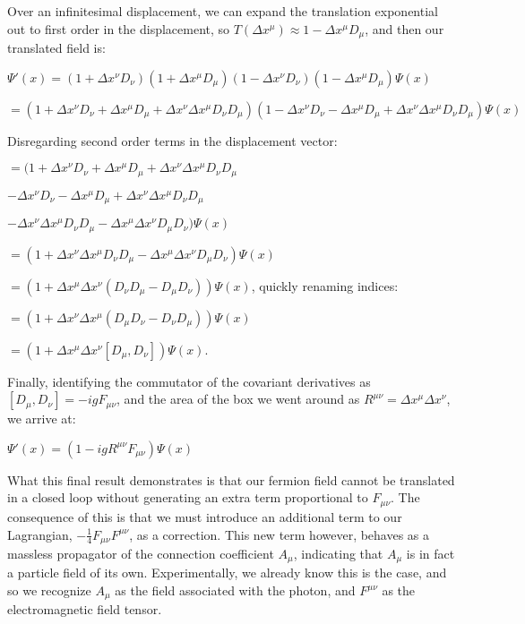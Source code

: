 \documentclass{article}
\begin{document}
        
        Over an infinitesimal displacement, we can expand the translation exponential out to first order in the displacement, so
        $ T(\Delta x^\mu) \approx 1 - \Delta x^\mu D_\mu $, and then our translated field is:


        $ \Psi'(x) = (1 + \Delta x^\nu D_\nu)(1 + \Delta x^\mu D_\mu)(1 - \Delta x^\nu D_\nu)(1 - \Delta x^\mu D_\mu) \Psi(x) $

        $ = (1 + \Delta x^\nu D_\nu + \Delta x^\mu D_\mu + \Delta x^\nu \Delta x^\mu D_\nu D_\mu)
        (1 - \Delta x^\nu D_\nu - \Delta x^\mu D_\mu + \Delta x^\nu \Delta x^\mu D_\nu D_\mu) \Psi(x) $

        \vspace{5pt}

        Disregarding second order terms in the displacement vector:

                $ = (1 + \Delta x^\nu D_\nu + \Delta x^\mu D_\mu + \Delta x^\nu \Delta x^\mu D_\nu D_\mu $

        \hspace{20pt}$ - \Delta x^\nu D_\nu - \Delta x^\mu D_\mu + \Delta x^\nu \Delta x^\mu D_\nu D_\mu $

        \hspace{20pt}$ - \Delta x^\nu \Delta x^\mu D_\nu D_\mu - \Delta x^\mu \Delta x^\nu D_\mu D_\nu) \Psi(x) $

        \vspace{5pt}

        $ = (1 + \Delta x^\nu \Delta x^\mu D_\nu D_\mu - \Delta x^\mu \Delta x^\nu D_\mu D_\nu) \Psi(x)$

        $ = \left(1 + \Delta x^\mu \Delta x^\nu ( D_\nu D_\mu - D_\mu D_\nu) \right) \Psi(x)$, quickly renaming indices:

        $ = \left(1 + \Delta x^\nu \Delta x^\mu ( D_\mu D_\nu - D_\nu D_\mu) \right) \Psi(x)$

        $ = \left(1 + \Delta x^\mu \Delta x^\nu [ D_\mu , D_\nu ] \right) \Psi(x)$.

        \vspace{5pt}
        Finally, identifying the commutator of the covariant derivatives as
        $ [ D_\mu , D_\nu ] = - i g F_{\mu \nu} $, and the area of the box we went around as
        $ R^{\mu \nu} = \Delta x^\mu \Delta x^\nu $, we arrive at:

        $ \Psi'(x) = \left(1 -i g R^{\mu \nu} F_{\mu \nu} \right) \Psi(x)$

        What this final result demonstrates is that our fermion field cannot be translated in a closed loop without generating an extra term proportional to $F_{\mu \nu}$. The consequence of this is that we must introduce an additional term to our Lagrangian,
        $-\frac{1}{4}F_{\mu \nu} F^{\mu \nu}$, as a correction. This new term however, behaves as a massless propagator of the connection coefficient $A_\mu$, indicating that $A_\mu$ is in fact a particle field of its own. Experimentally, we already know this is the case, and so we recognize $A_\mu$ as the field associated with the photon, and $F^{\mu \nu}$ as the electromagnetic field tensor.
\end{document}
